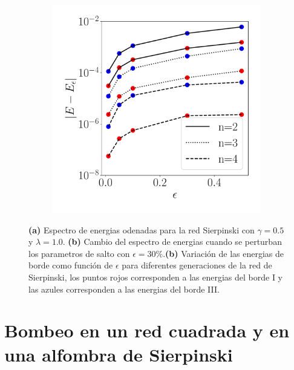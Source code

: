 \begin{figure}[tbh!]
\begin{subfigure}[b!]{0.33 \textwidth}
    \end{subfigure}
    \begin{subfigure}[b!]{0.33 \textwidth}
        \caption{}
        \includegraphics[width=\textwidth]{Imagenes/Resultados_Hoti_Fractal/pertubation_gen_fractal.pdf}
    \end{subfigure}\hspace*{-0.9em} \vspace*{1.0em}


       \caption{\textbf{(a)} Espectro de energias odenadas para la red Sierpinski con $\gamma = 0.5$ y $\lambda = 1.0$. \textbf{(b)} Cambio del espectro de energias cuando se perturban los parametros de salto con $\epsilon = 30\%$.\textbf{(b)} Variación de las energias de borde como función de $\epsilon$ para diferentes generaciones de la red de Sierpinski, los puntos rojos corresponden a las energias del borde I y las azules corresponden a las energias del borde III.}
       \label{fig:spectre_fractal_epsi}
\end{figure}



\newpage


\section{Bombeo en un red cuadrada y en una alfombra de Sierpinski}

